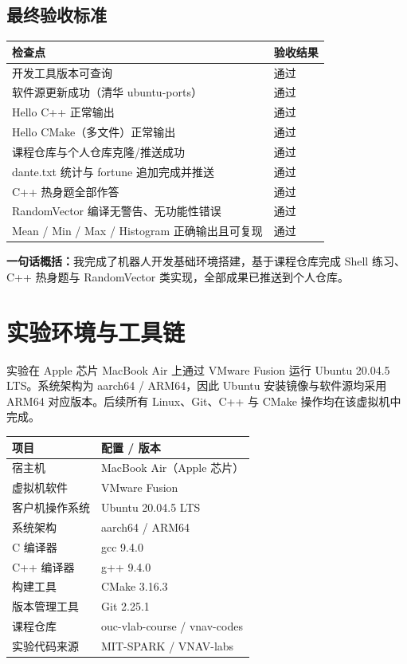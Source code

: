 \documentclass[12pt,a4paper]{ctexart}
\begin{document}
\subsection{最终验收标准}
\begin{center}
\begin{tabular}{ll}
\toprule
检查点 & 验收结果 \\
\midrule
开发工具版本可查询 & 通过 \\
软件源更新成功（清华 ubuntu-ports） & 通过 \\
Hello C++ 正常输出 & 通过 \\
Hello CMake（多文件）正常输出 & 通过 \\
课程仓库与个人仓库克隆/推送成功 & 通过 \\
dante.txt 统计与 fortune 追加完成并推送 & 通过 \\
C++ 热身题全部作答 & 通过 \\
RandomVector 编译无警告、无功能性错误 & 通过 \\
Mean / Min / Max / Histogram 正确输出且可复现 & 通过 \\
\bottomrule
\end{tabular}
\end{center}

\textbf{一句话概括：}我完成了机器人开发基础环境搭建，基于课程仓库完成 Shell 练习、C++ 热身题与 RandomVector 类实现，全部成果已推送到个人仓库。

\newpage

\section{实验环境与工具链}

实验在 Apple 芯片 MacBook Air 上通过 VMware Fusion 运行 Ubuntu 20.04.5 LTS。系统架构为 aarch64 / ARM64，因此 Ubuntu 安装镜像与软件源均采用 ARM64 对应版本。后续所有 Linux、Git、C++ 与 CMake 操作均在该虚拟机中完成。

\begin{center}
\begin{tabular}{ll}
\toprule
项目 & 配置 / 版本 \\
\midrule
宿主机 & MacBook Air（Apple 芯片） \\
虚拟机软件 & VMware Fusion \\
客户机操作系统 & Ubuntu 20.04.5 LTS \\
系统架构 & aarch64 / ARM64 \\
C 编译器 & gcc 9.4.0 \\
C++ 编译器 & g++ 9.4.0 \\
构建工具 & CMake 3.16.3 \\
版本管理工具 & Git 2.25.1 \\
课程仓库 & ouc-vlab-course / vnav-codes \\
实验代码来源 & MIT-SPARK / VNAV-labs \\
\bottomrule
\end{tabular}
\end{center}
\end{document}
